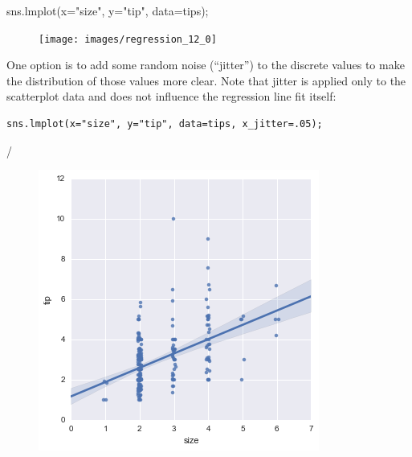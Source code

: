 \documentclass{beamer}
\begin{document}
\begin{frame}[fragile]
	\large
	
sns.lmplot(x="size", y="tip", data=tips);
\begin{figure}
	\centering
	\texttt{[image: images/regression\_12\_0]}
\end{figure}
\end{frame}
\begin{frame}[fragile]
	\large
One option is to add some random noise (“jitter”) to the discrete values to make the distribution of those values more clear. Note that jitter is applied only to the scatterplot data and does not influence the regression line fit itself:
\begin{framed}
\begin{verbatim}
sns.lmplot(x="size", y="tip", data=tips, x_jitter=.05);
\end{verbatim}
\end{framed}/
\begin{figure}
\centering
\includegraphics[width=0.7\linewidth]{images/regression_14_0}
\end{figure}


\end{frame}
\end{document}
